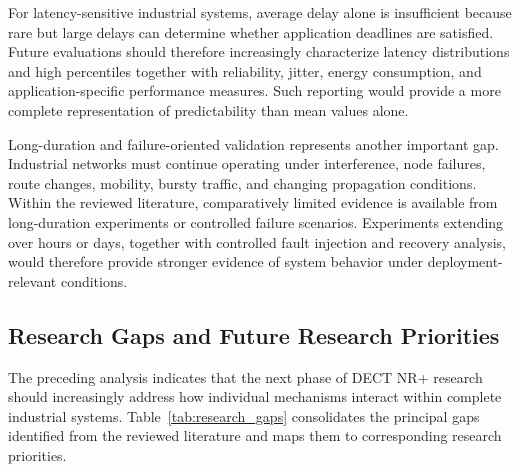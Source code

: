 For latency-sensitive industrial systems, average delay alone is insufficient
because rare but large delays can determine whether application deadlines are
satisfied. Future evaluations should therefore increasingly characterize
latency distributions and high percentiles together with reliability, jitter,
energy consumption, and application-specific performance measures. Such
reporting would provide a more complete representation of predictability than
mean values alone.

Long-duration and failure-oriented validation represents another important
gap. Industrial networks must continue operating under interference, node
failures, route changes, mobility, bursty traffic, and changing propagation
conditions. Within the reviewed literature, comparatively limited evidence is
available from long-duration experiments or controlled failure scenarios.
Experiments extending over hours or days, together with controlled fault
injection and recovery analysis, would therefore provide stronger evidence of
system behavior under deployment-relevant conditions.


\subsection{Research Gaps and Future Research Priorities}
\label{subsec:future_directions}

The preceding analysis indicates that the next phase of DECT NR+ research
should increasingly address how individual mechanisms interact within complete
industrial systems. Table~\ref{tab:research_gaps} consolidates the principal
gaps identified from the reviewed literature and maps them to corresponding
research priorities.

